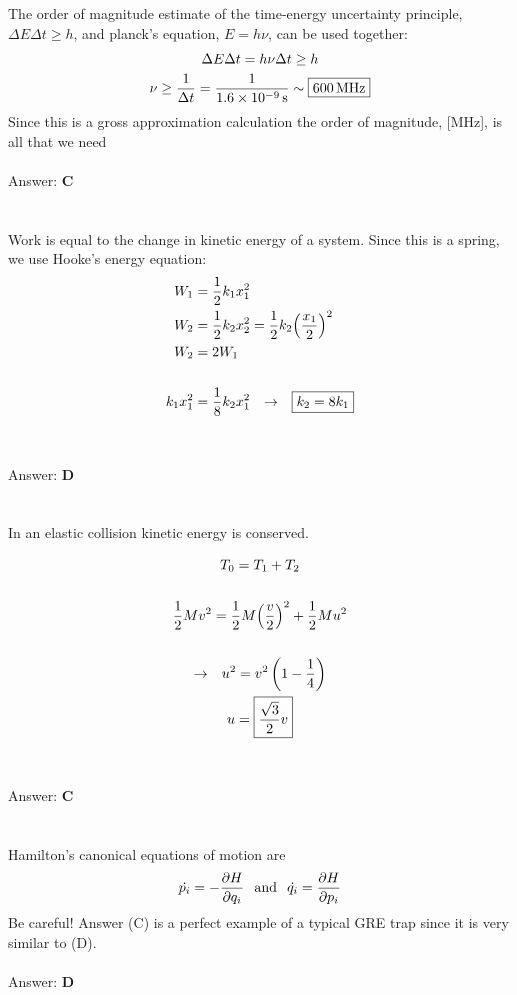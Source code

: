 \documentclass[12pt]{article}
\newcommand{\Answer}[1]{Answer: \textbf{#1}}
\newcommand{\Problem}[3]{
    \setcounter{section}{#1}
    \addtocounter{section}{-1}
    \section{}
    #3\\\\
    \Answer{#2}
}
\begin{document}
\Problem{27}{C}{%
The order of magnitude estimate  of the time-energy uncertainty principle, $\Delta E \Delta t \geq h$, and planck's equation, $E = h \nu$, can be used together:
\begin{gather}
\Delta E \Delta t = h \nu \Delta t \geq h\nonumber\\
\nu \geq \frac{1}{\Delta t} = \frac{1}{1.6\times 10^{-9}\,\text{s}} \sim \boxed{600\,\text{MHz}}\nonumber
\end{gather}
Since this is a gross approximation calculation the order of magnitude, [MHz], is all that we need
}

\Problem{28}{D}{%
Work is equal to the change in kinetic energy of a system. Since this is a spring, we use Hooke's energy equation:
\begin{align}
W_{1} &= \frac{1}{2}k_{1}x_{1}^{2}\nonumber\\
W_{2} &= \frac{1}{2}k_{2}x_{2}^{2} = \frac{1}{2}k_2 {\left(\frac{x_1}{2}\right)}^{2}\nonumber\\
W_{2} &= 2W_{1}\nonumber\\
\nonumber\\
k_{1}x_{1}^{2} &= \frac{1}{8}k_{2} x_{1}^{2} \hspace{.1in} \rightarrow \hspace{.1in} \boxed{k_{2} = 8k_{1}}\nonumber
\end{align}
}

\Problem{29}{C}{%
In an elastic collision kinetic energy is conserved.

\begin{gather}
T_{0} = T_{1} +T_{2}\nonumber\\
\nonumber\\
\frac{1}{2}Mv^2 = \frac{1}{2}M{\left(\frac{v}{2}\right)}^{2} + \frac{1}{2}Mu^{2}\nonumber\\\nonumber\\
\rightarrow \hspace{.1in} u^2 = v^2\left(1-\frac{1}{4}\right)\nonumber\\
u = \boxed{\frac{\sqrt{3}}{2}v}\nonumber
\end{gather}
}


\Problem{30}{D}{%
Hamilton's canonical equations of motion are
\begin{align}
\dot{p_{i}} = -\frac{\partial H}{\partial q_{i}} \hspace{.1in} \text{and} \hspace{.1in} \dot{q_{i}} = \frac{\partial H}{\partial p_{i}}
\end{align}
Be careful! Answer (C) is a perfect example of a typical GRE trap since it is very similar to (D).
}
\end{document}
